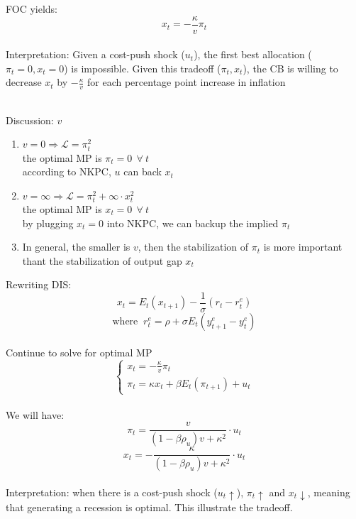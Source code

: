 \documentclass{article}
\begin{document}
FOC yields: 
$$x_t = -\frac{\kappa}{v}\pi_t$$
\\
{\color{ForestGreen}Interpretation: Given a cost-push shock ($u_t$), the first best allocation ($\pi_t=0, x_t=0$) is impossible. Given this tradeoff ($\pi_t,x_t$), the CB is willing to decrease $x_t$ by $-\frac{\kappa}{v}$ for each percentage point increase in inflation}\\
\\
{\color{blue}Discussion: $v$
\begin{enumerate}
    \item $v=0 \Rightarrow \mathscr{L} = \pi_t^2$\\
    the optimal MP is $\pi_t = 0 \ \ \forall\ t$\\
    according to NKPC, $u$ can back $x_t$

    \item $v=\infty \Rightarrow \mathscr{L} = \pi_t^2 + \infty\cdot x_t^2$\\
    the optimal MP is $x_t = 0\ \ \forall\ t$\\
    by plugging $x_t = 0$ into NKPC, we can backup the implied $\pi_t$

    \item In general, the smaller is $v$, then the stabilization of $\pi_t$ is more important thant the stabilization of output gap $x_t$
\end{enumerate}
}

\noindent Rewriting DIS:
$$x_t = E_t(x_{t+1}) - \frac{1}{\sigma} (r_t - r_t^e)$$
$$\text{where  }\ r_t^e = \rho + \sigma E_t(y_{t+1}^e - y_t^e)$$
\\
Continue to solve for optimal MP
\begin{equation*}
    \begin{cases}
        x_t = -\frac{\kappa}{v}\pi_t\\
        \pi_t = \kappa x_t + \beta E_t(\pi_{t+1}) + u_t
    \end{cases}
\end{equation*}
\\
We will have:
$$\pi_t = \frac{v}{(1-\beta\rho_u)v + \kappa^2}\cdot u_t$$
$$x_t = -\frac{\kappa}{(1-\beta\rho_u)v + \kappa^2}\cdot u_t$$
\\
{\color{ForestGreen}Interpretation: when there is a cost-push shock ($u_t \uparrow$), $\pi_t \uparrow$ and $x_t \downarrow$, meaning that generating a recession is optimal. This illustrate the tradeoff.}
\end{document}
